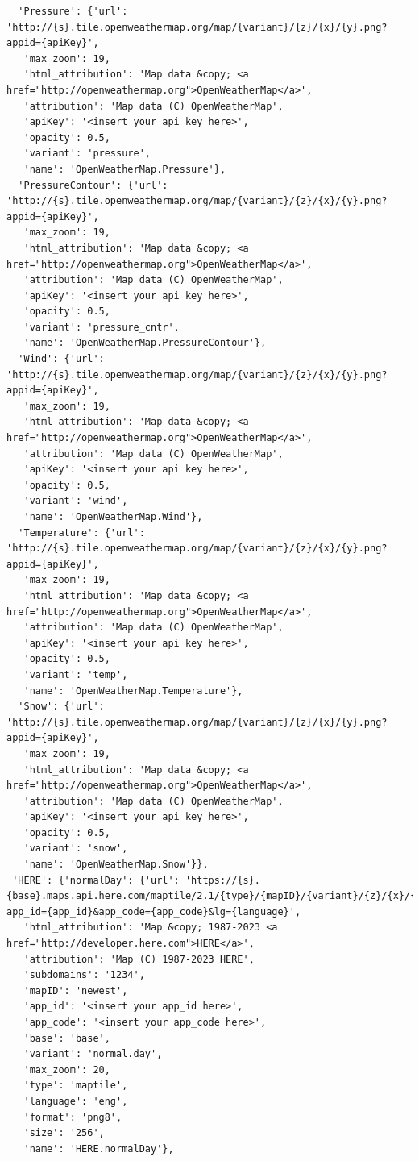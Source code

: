 \documentclass[
  letterpaper,
  DIV=11,
  numbers=noendperiod]{scrreprt}
\begin{document}
\begin{verbatim}
  'Pressure': {'url': 'http://{s}.tile.openweathermap.org/map/{variant}/{z}/{x}/{y}.png?appid={apiKey}',
   'max_zoom': 19,
   'html_attribution': 'Map data &copy; <a href="http://openweathermap.org">OpenWeatherMap</a>',
   'attribution': 'Map data (C) OpenWeatherMap',
   'apiKey': '<insert your api key here>',
   'opacity': 0.5,
   'variant': 'pressure',
   'name': 'OpenWeatherMap.Pressure'},
  'PressureContour': {'url': 'http://{s}.tile.openweathermap.org/map/{variant}/{z}/{x}/{y}.png?appid={apiKey}',
   'max_zoom': 19,
   'html_attribution': 'Map data &copy; <a href="http://openweathermap.org">OpenWeatherMap</a>',
   'attribution': 'Map data (C) OpenWeatherMap',
   'apiKey': '<insert your api key here>',
   'opacity': 0.5,
   'variant': 'pressure_cntr',
   'name': 'OpenWeatherMap.PressureContour'},
  'Wind': {'url': 'http://{s}.tile.openweathermap.org/map/{variant}/{z}/{x}/{y}.png?appid={apiKey}',
   'max_zoom': 19,
   'html_attribution': 'Map data &copy; <a href="http://openweathermap.org">OpenWeatherMap</a>',
   'attribution': 'Map data (C) OpenWeatherMap',
   'apiKey': '<insert your api key here>',
   'opacity': 0.5,
   'variant': 'wind',
   'name': 'OpenWeatherMap.Wind'},
  'Temperature': {'url': 'http://{s}.tile.openweathermap.org/map/{variant}/{z}/{x}/{y}.png?appid={apiKey}',
   'max_zoom': 19,
   'html_attribution': 'Map data &copy; <a href="http://openweathermap.org">OpenWeatherMap</a>',
   'attribution': 'Map data (C) OpenWeatherMap',
   'apiKey': '<insert your api key here>',
   'opacity': 0.5,
   'variant': 'temp',
   'name': 'OpenWeatherMap.Temperature'},
  'Snow': {'url': 'http://{s}.tile.openweathermap.org/map/{variant}/{z}/{x}/{y}.png?appid={apiKey}',
   'max_zoom': 19,
   'html_attribution': 'Map data &copy; <a href="http://openweathermap.org">OpenWeatherMap</a>',
   'attribution': 'Map data (C) OpenWeatherMap',
   'apiKey': '<insert your api key here>',
   'opacity': 0.5,
   'variant': 'snow',
   'name': 'OpenWeatherMap.Snow'}},
 'HERE': {'normalDay': {'url': 'https://{s}.{base}.maps.api.here.com/maptile/2.1/{type}/{mapID}/{variant}/{z}/{x}/{y}/{size}/{format}?app_id={app_id}&app_code={app_code}&lg={language}',
   'html_attribution': 'Map &copy; 1987-2023 <a href="http://developer.here.com">HERE</a>',
   'attribution': 'Map (C) 1987-2023 HERE',
   'subdomains': '1234',
   'mapID': 'newest',
   'app_id': '<insert your app_id here>',
   'app_code': '<insert your app_code here>',
   'base': 'base',
   'variant': 'normal.day',
   'max_zoom': 20,
   'type': 'maptile',
   'language': 'eng',
   'format': 'png8',
   'size': '256',
   'name': 'HERE.normalDay'},

\end{verbatim}
\end{document}
